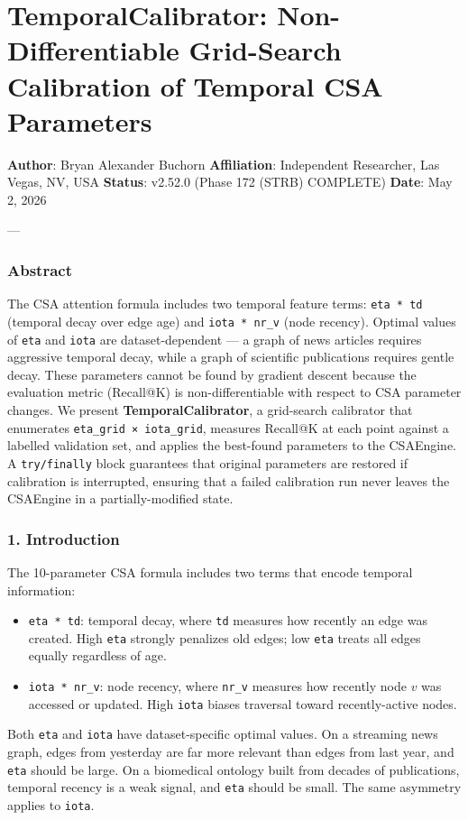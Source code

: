 \section{TemporalCalibrator: Non-Differ\-entiable Grid-Search Calibration of Temporal CSA Parameters}

\textbf{Author}: Bryan Alexander Buchorn  
\textbf{Affiliation}: Independent Researcher, Las Vegas, NV, USA  
\textbf{Status}: v2.52.0 (Phase 172 (STRB) COMPLETE)
\textbf{Date}: May 2, 2026

---

\subsubsection{Abstract}
The CSA attention formula includes two temporal feature terms: \texttt{eta * td} (temporal decay over edge age) and \texttt{iota * nr\_v} (node recency). Optimal values of \texttt{eta} and \texttt{iota} are dataset-dependent — a graph of news articles requires aggressive temporal decay, while a graph of scientific publi\-cations requires gentle decay. These parameters cannot be found by gradient descent because the evaluation metric (Recall@K) is non-diffe\-rentiable with respect to CSA parameter changes. We present \textbf{TemporalCalibrator}, a grid-search calibrator that enumerates \texttt{eta\_grid × iota\_grid}, measures Recall@K at each point against a labelled validation set, and applies the best-found parameters to the CSAEngine. A \texttt{try/finally} block guarantees that original parameters are restored if calibration is interrupted, ensuring that a failed calibration run never leaves the CSAEngine in a partially-modified state.

\subsubsection{1. Introd\-uction}
The 10-parameter CSA formula \cite{vaswani2017attention} includes two terms that encode temporal information:

\begin{itemize}
\item \texttt{eta * td}: temporal decay, where \texttt{td} measures how recently an edge was created. High \texttt{eta} strongly penalizes old edges; low \texttt{eta} treats all edges equally regardless of age.
\item \texttt{iota * nr\_v}: node recency, where \texttt{nr\_v} measures how recently node $v$ was accessed or updated. High \texttt{iota} biases traversal toward recently-active nodes.

\end{itemize}
Both \texttt{eta} and \texttt{iota} have dataset-specific optimal values. On a streaming news graph, edges from yesterday are far more relevant than edges from last year, and \texttt{eta} should be large. On a biomedical ontology built from decades of publi\-cations, temporal recency is a weak signal, and \texttt{eta} should be small. The same asymmetry applies to \texttt{iota}.

